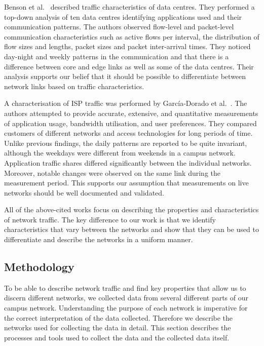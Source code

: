 Benson et al.~\cite{Benson-2010-Network} described traffic characteristics of data centres. They performed a top-down analysis of ten data centres identifying applications used and their communication patterns. The authors observed flow-level and packet-level communication characteristics such as active flows per interval, the distribution of flow sizes and lengths, packet sizes and packet inter-arrival times. They noticed day-night and weekly patterns in the communication and that there is a difference between core and edge links as well as some of the data centres. Their analysis supports our belief that it should be possible to differentiate between network links based on traffic characteristics.

A characterisation of ISP traffic was performed by García-Dorado et al.~\cite{Garcia-Dorado-2012-Characterization}. The authors attempted to provide accurate, extensive, and quantitative measurements of application usage, bandwidth utilisation, and user preferences. They compared customers of different networks and access technologies for long periods of time. Unlike previous findings, the daily patterns are reported to be quite invariant, although the weekdays were different from weekends in a campus network. Application traffic shares differed significantly between the individual networks. Moreover, notable changes were observed on the same link during the measurement period. This supports our assumption that measurements on live networks should be well documented and validated.

All of the above-cited works focus on describing the properties and characteristics of network traffic. The key difference to our work is that we identify characteristics that vary between the networks and show that they can be used to differentiate and describe the networks in a uniform manner.

\subsection{Methodology} \label{subsec:characterization-methodology}

To be able to describe network traffic and find key properties that allow us to discern different networks, we collected data from several different parts of our campus network. Understanding the purpose of each network is imperative for the correct interpretation of the data collected. Therefore we describe the networks used for collecting the data in detail. This section describes the processes and tools used to collect the data and the collected data itself. 

